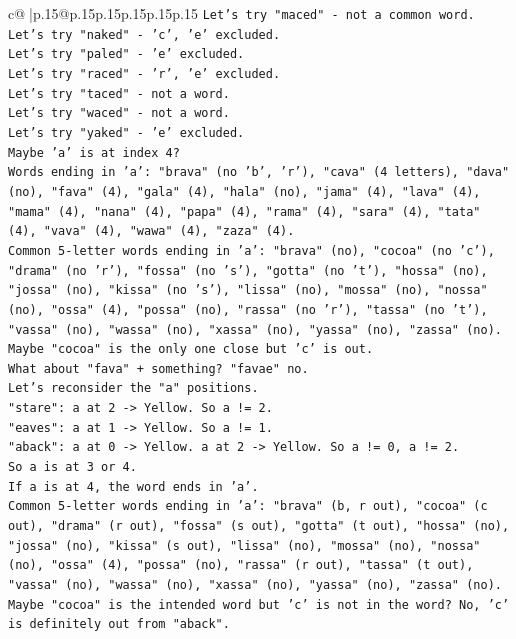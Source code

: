 \documentclass{article}
\begin{document}
{\begin{supertabular}{c@{$\;$}|p{.15\linewidth}@{}p{.15\linewidth}p{.15\linewidth}p{.15\linewidth}p{.15\linewidth}p{.15\linewidth}}
{{{\texttt{Let's try "maced" {-} not a common word.} \\
\texttt{Let's try "naked" {-} 'c', 'e' excluded.} \\
\texttt{Let's try "paled" {-} 'e' excluded.} \\
\texttt{Let's try "raced" {-} 'r', 'e' excluded.} \\
\texttt{Let's try "taced" {-} not a word.} \\
\texttt{Let's try "waced" {-} not a word.} \\
\texttt{Let's try "yaked" {-} 'e' excluded.} \\
\texttt{Maybe 'a' is at index 4?} \\
\texttt{Words ending in 'a': "brava" (no 'b', 'r'), "cava" (4 letters), "dava" (no), "fava" (4), "gala" (4), "hala" (no), "jama" (4), "lava" (4), "mama" (4), "nana" (4), "papa" (4), "rama" (4), "sara" (4), "tata" (4), "vava" (4), "wawa" (4), "zaza" (4).} \\
\texttt{Common 5{-}letter words ending in 'a': "brava" (no), "cocoa" (no 'c'), "drama" (no 'r'), "fossa" (no 's'), "gotta" (no 't'), "hossa" (no), "jossa" (no), "kissa" (no 's'), "lissa" (no), "mossa" (no), "nossa" (no), "ossa" (4), "possa" (no), "rassa" (no 'r'), "tassa" (no 't'), "vassa" (no), "wassa" (no), "xassa" (no), "yassa" (no), "zassa" (no).} \\
\texttt{Maybe "cocoa" is the only one close but 'c' is out.} \\
\texttt{What about "fava" + something? "favae" no.} \\
\texttt{Let's reconsider the "a" positions.} \\
\texttt{"stare": a at 2 {-}> Yellow. So a != 2.} \\
\texttt{"eaves": a at 1 {-}> Yellow. So a != 1.} \\
\texttt{"aback": a at 0 {-}> Yellow. a at 2 {-}> Yellow. So a != 0, a != 2.} \\
\texttt{So a is at 3 or 4.} \\
\texttt{If a is at 4, the word ends in 'a'.} \\
\texttt{Common 5{-}letter words ending in 'a': "brava" (b, r out), "cocoa" (c out), "drama" (r out), "fossa" (s out), "gotta" (t out), "hossa" (no), "jossa" (no), "kissa" (s out), "lissa" (no), "mossa" (no), "nossa" (no), "ossa" (4), "possa" (no), "rassa" (r out), "tassa" (t out), "vassa" (no), "wassa" (no), "xassa" (no), "yassa" (no), "zassa" (no).} \\
\texttt{Maybe "cocoa" is the intended word but 'c' is not in the word? No, 'c' is definitely out from "aback".} \\
}}}
\end{supertabular}}
\end{document}
